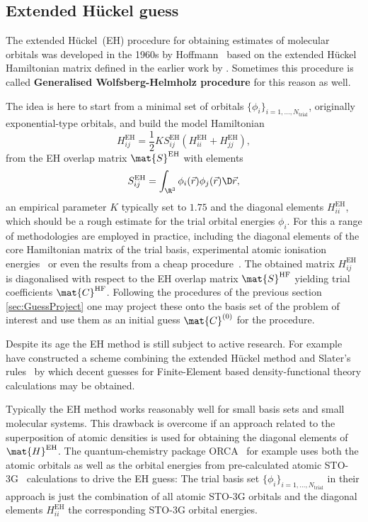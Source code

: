 \subsection{Extended Hückel guess}
The extended Hückel~(EH) procedure for obtaining estimates
of molecular orbitals was developed in the 1960s
by Hoffmann~\cite{Hoffmann1963}
based on the extended Hückel Hamiltonian matrix defined
in the earlier work by \citet{Wolfsberg1952}.
Sometimes this procedure is called
\textbf{Generalised Wolfsberg-Helmholz procedure}
for this reason as well.

The idea is here to start from a minimal set of orbitals
$\{\phi_i\}_{i=1,\ldots,N_\text{trial}}$,
originally exponential-type orbitals,
and build the model Hamiltonian
\[
	H_{ij}^\text{EH}
		= \frac12 K S^\text{EH}_{ij} \left( H_{ii}^\text{EH} + H_{jj}^\text{EH} \right),
\]
from the EH overlap matrix $\mat{S}^\text{EH}$ with elements
\[ S^\text{EH}_{ij} = \int_{\R^3} \phi_i(\vec{r}) \phi_j(\vec{r}) \D\vec{r}, \]
an empirical parameter $K$ typically set to $1.75$
and the diagonal elements $H_{ii}^\text{EH}$,
which should be a rough estimate for the trial orbital energies $\phi_i$.
For this a range of methodologies are employed in practice,
including the diagonal elements of the core Hamiltonian matrix
of the trial basis,
experimental atomic ionisation energies~\cite{Yamehmop}
or even the results from a cheap \SCF procedure~\cite{ORCA}.
The obtained matrix $H_{ij}^\text{EH}$ is diagonalised with respect
to the EH overlap matrix $\mat{S}^\text{HF}$
yielding trial coefficients $\mat{C}^\text{HF}$.
Following the procedures of the previous section \ref{sec:GuessProject}
one may project these onto the basis set of the problem of interest
and use them as an initial guess $\mat{C}^{(0)}$ for the \SCF procedure.

Despite its age the EH method is still subject to active research.
For example \citet{Lee2015} have constructed a scheme combining
the extended Hückel method and Slater's rules~\cite{Slater1930}
by which decent guesses for Finite-Element based density-functional theory
calculations may be obtained.

Typically the EH method works reasonably well
for small basis sets and small molecular systems.
This drawback is overcome if an approach related to the
superposition of atomic densities is used for obtaining the diagonal
elements of $\mat{H}^\text{EH}$.
The quantum-chemistry package ORCA~\cite{ORCA} for example
uses both the atomic orbitals as well as the orbital energies
from pre-calculated atomic STO-3G~\cite{Hehre1969} calculations
to drive the EH guess:
The trial basis set $\{\phi_i\}_{i=1,\ldots,N_\text{trial}}$
in their approach is just the combination of all atomic STO-3G orbitals
and the diagonal elements $H_{ii}^\text{EH}$ the corresponding STO-3G orbital energies.

